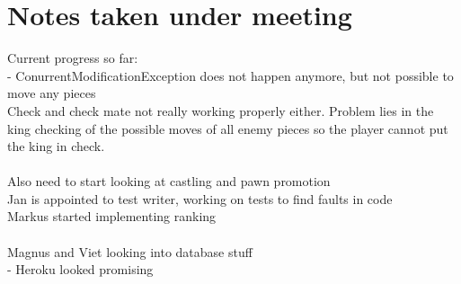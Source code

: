 \documentclass[letterpaper,11pt]{article}
\begin{document}
\section*{Notes taken under meeting}
Current progress so far:\\
- ConurrentModificationException does not happen anymore, but not possible to move any pieces\\
Check and check mate not really working properly either. Problem lies in the king checking of the possible moves of all enemy pieces so the player cannot put the king in check.\\\\
Also need to start looking at castling and pawn promotion\\
Jan is appointed to test writer, working on tests to find faults in code\\
Markus started implementing ranking\\\\
Magnus and Viet looking into database stuff\\
- Heroku looked promising
\end{document}
